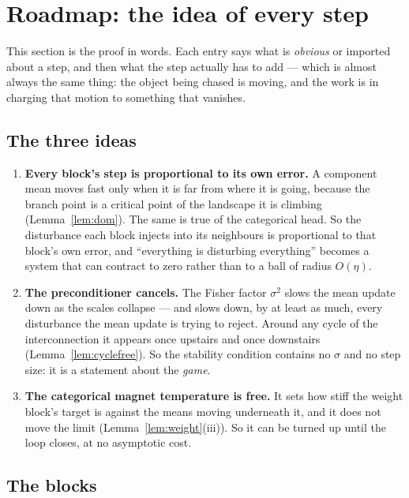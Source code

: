 \documentclass[11pt]{article}
\theoremstyle{definition}
\begin{document}
\tableofcontents

\section{Roadmap: the idea of every step}\label{sec:roadmap}

This section is the proof in words. Each entry says what is \emph{obvious} or
imported about a step, and then what the step actually has to add --- which is
almost always the same thing: the object being chased is moving, and the work is
in charging that motion to something that vanishes.

\subsection*{The three ideas}

\begin{enumerate}[leftmargin=1.4em]
\item \textbf{Every block's step is proportional to its own error.} A component
  mean moves fast only when it is far from where it is going, because the branch
  point is a critical point of the landscape it is climbing
  (Lemma~\ref{lem:dom}). The same is true of the categorical head. So the
  disturbance each block injects into its neighbours is proportional to that
  block's own error, and ``everything is disturbing everything'' becomes a system
  that can contract to zero rather than to a ball of radius $O(\eta)$.
\item \textbf{The preconditioner cancels.} The Fisher factor $\sigma^2$ slows the
  mean update down as the scales collapse --- and slows down, by at least as much,
  every disturbance the mean update is trying to reject. Around any cycle of the
  interconnection it appears once upstairs and once downstairs
  (Lemma~\ref{lem:cyclefree}). So the stability condition contains no $\sigma$ and
  no step size: it is a statement about the \emph{game}.
\item \textbf{The categorical magnet temperature is free.} It sets how stiff the
  weight block's target is against the means moving underneath it, and it does
  not move the limit (Lemma~\ref{lem:weight}(iii)). So it can be turned up until
  the loop closes, at no asymptotic cost.
\end{enumerate}

\subsection*{The blocks}
\end{document}
